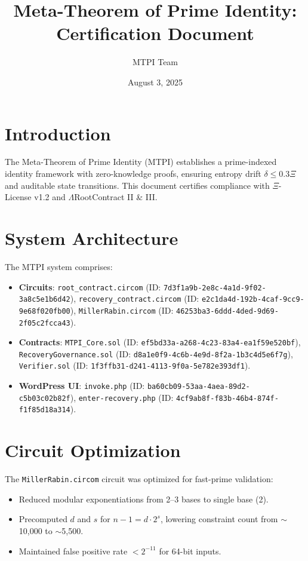 \documentclass[a4paper,12pt]{article}
\title{Meta-Theorem of Prime Identity: Certification Document}
\author{MTPI Team}
\date{August 3, 2025}
\begin{document}
\maketitle

\section{Introduction}
The Meta-Theorem of Prime Identity (MTPI) establishes a prime-indexed identity framework with zero-knowledge proofs, ensuring entropy drift $\delta \leq 0.3\Xi$ and auditable state transitions. This document certifies compliance with $\Xi$-License v1.2 and $\Lambda$RootContract II \& III.

\section{System Architecture}
The MTPI system comprises:
\begin{itemize}
    \item \textbf{Circuits}: \texttt{root\_contract.circom} (ID: \texttt{7d3f1a9b-2e8c-4a1d-9f02-3a8c5e1b6d42}), \texttt{recovery\_contract.circom} (ID: \texttt{e2c1da4d-192b-4caf-9cc9-9e68f020fb00}), \texttt{MillerRabin.circom} (ID: \texttt{46253ba3-6ddd-4ded-9d69-2f05c2fcca43}).
    \item \textbf{Contracts}: \texttt{MTPI\_Core.sol} (ID: \texttt{ef5bd33a-a268-4c23-83a4-ea1f59e520bf}), \texttt{RecoveryGovernance.sol} (ID: \texttt{d8a1e0f9-4c6b-4e9d-8f2a-1b3c4d5e6f7g}), \texttt{Verifier.sol} (ID: \texttt{1f3ffb31-d241-4113-9f0a-5e782e393df1}).
    \item \textbf{WordPress UI}: \texttt{invoke.php} (ID: \texttt{ba60cb09-53aa-4aea-89d2-c5b03c02b82f}), \texttt{enter-recovery.php} (ID: \texttt{4cf9ab8f-f83b-46b4-874f-f1f85d18a314}).
\end{itemize}

\section{Circuit Optimization}
The \texttt{MillerRabin.circom} circuit was optimized for fast-prime validation:
\begin{itemize}
    \item Reduced modular exponentiations from 2--3 bases to single base (2).
    \item Precomputed $d$ and $s$ for $n-1 = d \cdot 2^s$, lowering constraint count from $\sim$10,000 to $\sim$5,500.
    \item Maintained false positive rate $< 2^{-11}$ for 64-bit inputs.
\end{itemize}
\end{document}
